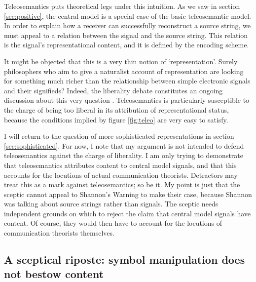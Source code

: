 \documentclass[12pt]{article}
\begin{document}
Teleosemantics puts theoretical legs under this intuition.
As we saw in section \ref{sec:positive}, the central model is a special case of the basic teleosemantic model.
In order to explain how a receiver can successfully reconstruct a source string, we must appeal to a relation between the signal and the source string.
This relation is the signal's representational content, and it is defined by the encoding scheme.

It might be objected that this is a very thin notion of `representation'.
Surely philosophers who aim to give a naturalist account of representation are looking for something much richer than the relationship between simple electronic signals and their signifieds?
Indeed, the liberality debate constitutes an ongoing discussion about this very question \citep{artiga2016liberal,artiga2022strong,desouzafilho2022dual}.
Teleosemantics is particularly susceptible to the charge of being too liberal in its attribution of representational status, because the conditions implied by figure \ref{fig:teleo} are very easy to satisfy.

I will return to the question of more sophisticated representations in section \ref{sec:sophisticated}.
For now, I note that my argument is not intended to defend teleosemantics against the charge of liberality.
I am only trying to demonstrate that teleosemantics attributes content to central model signals, and that this accounts for the locutions of actual communication theorists.
Detractors may treat this as a mark against teleosemantics; so be it.
My point is just that the sceptic cannot appeal to {\sc Shannon's Warning} to make their case, because Shannon was talking about source strings rather than signals.
The sceptic needs independent grounds on which to reject the claim that central model signals have content.
Of course, they would then have to account for the locutions of communication theorists themselves.


\subsection{A sceptical riposte: symbol manipulation does not bestow content}
\end{document}
